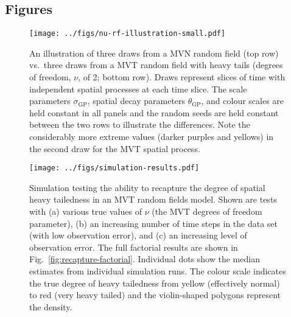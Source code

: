 \documentclass[12pt,english]{article}
\begin{document}
\begin{spacing}{1.8}
\setlength{\bibsep}{0pt plus 0ex}



\clearpage

\section{Figures}

\begin{figure}[htb]
  \begin{center}
    \texttt{[image: ../figs/nu-rf-illustration-small.pdf]}
    \caption{An illustration of three draws from a MVN random field (top row)
      vs.\ three draws from a MVT random field with heavy tails
      (degrees of freedom, $\nu$, of 2; bottom row).
      Draws represent slices of time with independent spatial
      processes at each time slice.
      The scale parameters $\sigma_{\mathrm{GP}}$, spatial decay parameters $\theta_{\mathrm{GP}}$,
      and colour scales are held constant in all panels
      and the random seeds are held constant between the two rows
      to illustrate the differences.
      Note the considerably more extreme values (darker purples and yellows) in
      the second draw for the MVT spatial process.}
    \label{fig:nu}
  \end{center}
\end{figure}

\clearpage

\begin{figure}[htb]
  \begin{center}
    \texttt{[image: ../figs/simulation-results.pdf]}
    \caption{Simulation testing the ability to recapture the
      degree of spatial heavy tailedness in an MVT random fields model.
      Shown are tests with
      (a) various true values of $\nu$ (the MVT degrees of freedom parameter),
      (b) an increasing number of time steps in the data set (with low observation error),
      and (c) an increasing level of observation error.
      The full factorial results are shown in Fig.~\ref{fig:recapture-factorial}.
      Individual dots show the median estimates from individual simulation runs.
      The colour scale indicates the true degree of heavy tailedness from
      yellow (effectively normal) to red (very heavy tailed) and the
      violin-shaped polygons represent the density.
    }
    \label{fig:recapture}
  \end{center}
\end{figure}


\end{spacing}
\end{document}
